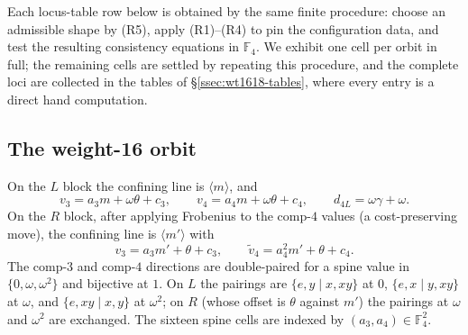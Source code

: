\documentclass[11pt]{article}
\newcommand{\F}[1]{\mathbb{F}_{#1}}
\theoremstyle{plain}
\theoremstyle{definition}
\theoremstyle{remark}
\begin{document}
Each locus-table row below is obtained by the same finite procedure: choose an admissible
shape by (R5), apply (R1)--(R4) to pin the configuration data, and test the resulting
consistency equations in $\F4$. We exhibit one cell per orbit in full; the remaining cells
are settled by repeating this procedure, and the complete loci are collected in the tables of
\S\ref{ssec:wt1618-tables}, where every entry is a direct hand computation.

\subsection{The weight-16 orbit}\label{ssec:wt16}

On the $L$ block the confining line is $\langle m\rangle$, and
\[
  v_3=a_3 m+\omega\theta+c_3,\qquad v_4=a_4 m+\omega\theta+c_4,\qquad d_{4L}=\omega\gamma+\omega .
\]
On the $R$ block, after applying Frobenius to the comp-$4$ values (a cost-preserving move),
the confining line is $\langle m'\rangle$ with
\[
  v_3=a_3 m'+\theta+c_3,\qquad \tilde v_4=a_4^2 m'+\theta+c_4 .
\]
The comp-$3$ and comp-$4$ directions are double-paired for a spine value in
$\{0,\omega,\omega^2\}$ and bijective at $1$. On $L$ the pairings are $\{e,y\mid x,xy\}$ at
$0$, $\{e,x\mid y,xy\}$ at $\omega$, and $\{e,xy\mid x,y\}$ at $\omega^2$; on $R$ (whose
offset is $\theta$ against $m'$) the pairings at $\omega$ and $\omega^2$ are exchanged. The
sixteen spine cells are indexed by $(a_3,a_4)\in\F4^2$.
\end{document}
